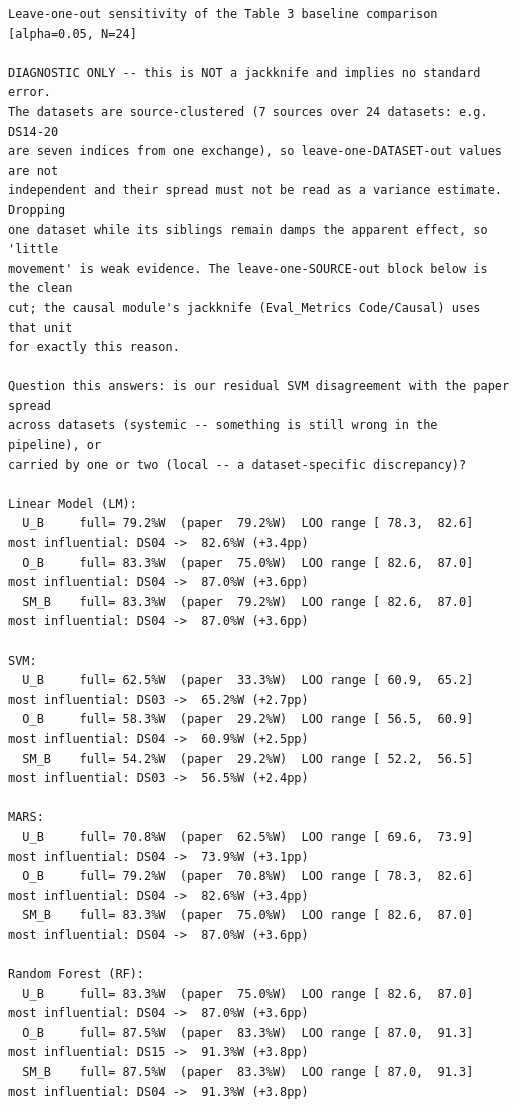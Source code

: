 \begingroup
{}
\label{tab:exp002_cmp_cmp_sensitivity}
\tiny
\begin{verbatim}
Leave-one-out sensitivity of the Table 3 baseline comparison  [alpha=0.05, N=24]

DIAGNOSTIC ONLY -- this is NOT a jackknife and implies no standard error.
The datasets are source-clustered (7 sources over 24 datasets: e.g. DS14-20
are seven indices from one exchange), so leave-one-DATASET-out values are not
independent and their spread must not be read as a variance estimate. Dropping
one dataset while its siblings remain damps the apparent effect, so 'little
movement' is weak evidence. The leave-one-SOURCE-out block below is the clean
cut; the causal module's jackknife (Eval_Metrics Code/Causal) uses that unit
for exactly this reason.

Question this answers: is our residual SVM disagreement with the paper spread
across datasets (systemic -- something is still wrong in the pipeline), or
carried by one or two (local -- a dataset-specific discrepancy)?

Linear Model (LM):
  U_B     full= 79.2%W  (paper  79.2%W)  LOO range [ 78.3,  82.6]  most influential: DS04 ->  82.6%W (+3.4pp)
  O_B     full= 83.3%W  (paper  75.0%W)  LOO range [ 82.6,  87.0]  most influential: DS04 ->  87.0%W (+3.6pp)
  SM_B    full= 83.3%W  (paper  79.2%W)  LOO range [ 82.6,  87.0]  most influential: DS04 ->  87.0%W (+3.6pp)

SVM:
  U_B     full= 62.5%W  (paper  33.3%W)  LOO range [ 60.9,  65.2]  most influential: DS03 ->  65.2%W (+2.7pp)
  O_B     full= 58.3%W  (paper  29.2%W)  LOO range [ 56.5,  60.9]  most influential: DS04 ->  60.9%W (+2.5pp)
  SM_B    full= 54.2%W  (paper  29.2%W)  LOO range [ 52.2,  56.5]  most influential: DS03 ->  56.5%W (+2.4pp)

MARS:
  U_B     full= 70.8%W  (paper  62.5%W)  LOO range [ 69.6,  73.9]  most influential: DS04 ->  73.9%W (+3.1pp)
  O_B     full= 79.2%W  (paper  70.8%W)  LOO range [ 78.3,  82.6]  most influential: DS04 ->  82.6%W (+3.4pp)
  SM_B    full= 83.3%W  (paper  75.0%W)  LOO range [ 82.6,  87.0]  most influential: DS04 ->  87.0%W (+3.6pp)

Random Forest (RF):
  U_B     full= 83.3%W  (paper  75.0%W)  LOO range [ 82.6,  87.0]  most influential: DS04 ->  87.0%W (+3.6pp)
  O_B     full= 87.5%W  (paper  83.3%W)  LOO range [ 87.0,  91.3]  most influential: DS15 ->  91.3%W (+3.8pp)
  SM_B    full= 87.5%W  (paper  83.3%W)  LOO range [ 87.0,  91.3]  most influential: DS04 ->  91.3%W (+3.8pp)


\end{verbatim}
